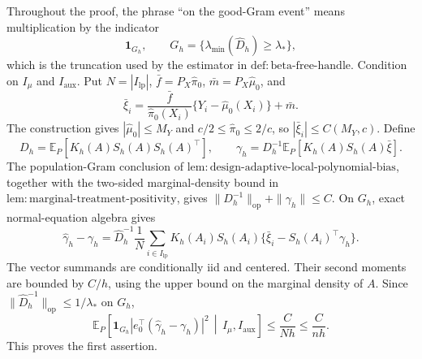 Throughout the proof, the phrase ``on the good-Gram event'' means multiplication by the indicator
\[
\mathbf 1_{G_h},
\qquad
G_h=\{\lambda_{\min}(\widehat D_h)\ge\lambda_*\},
\]
which is the truncation used by the estimator in \(\mathrm{def:beta\text{-}free\text{-}handle}\). Condition on \(I_\mu\) and \(I_{\mathrm{aux}}\). Put \(N=|I_{\mathrm{lp}}|\), \(\bar f=P_X\widehat\pi_0\), \(\bar m=P_X\widehat\mu_0\), and
\[
\bar\xi_i=
\frac{\bar f}{\widehat\pi_0(X_i)}\{Y_i-\widehat\mu_0(X_i)\}+\bar m.
\]
The construction gives \(|\widehat\mu_0|\le M_Y\) and \(c/2\le\widehat\pi_0\le2/c\), so \(|\bar\xi_i|\le C(M_Y,c)\). Define
\[
D_h=\mathbb E_P[K_h(A)S_h(A)S_h(A)^\top],
\qquad
\gamma_h=D_h^{-1}\mathbb E_P[K_h(A)S_h(A)\bar\xi].
\]
The population-Gram conclusion of \(\mathrm{lem:design\text{-}adaptive\text{-}local\text{-}polynomial\text{-}bias}\), together with the two-sided marginal-density bound in \(\mathrm{lem:marginal\text{-}treatment\text{-}positivity}\), gives \(\|D_h^{-1}\|_{\mathrm{op}}+\|\gamma_h\|\le C\). On \(G_h\), exact normal-equation algebra gives
\[
\widehat\gamma_h-\gamma_h
=
\widehat D_h^{-1}\frac1N\sum_{i\in I_{\mathrm{lp}}}
K_h(A_i)S_h(A_i)\{\bar\xi_i-S_h(A_i)^\top\gamma_h\}.
\]
The vector summands are conditionally iid and centered. Their second moments are bounded by \(C/h\), using the upper bound on the marginal density of \(A\). Since \(\|\widehat D_h^{-1}\|_{\mathrm{op}}\le1/\lambda_*\) on \(G_h\),
\[
\mathbb E_P\!\left[
\mathbf1_{G_h}|e_0^\top(\widehat\gamma_h-\gamma_h)|^2
\,\middle|\,I_\mu,I_{\mathrm{aux}}
\right]
\le\frac{C}{Nh}\le\frac{C}{nh}.
\]
This proves the first assertion.

